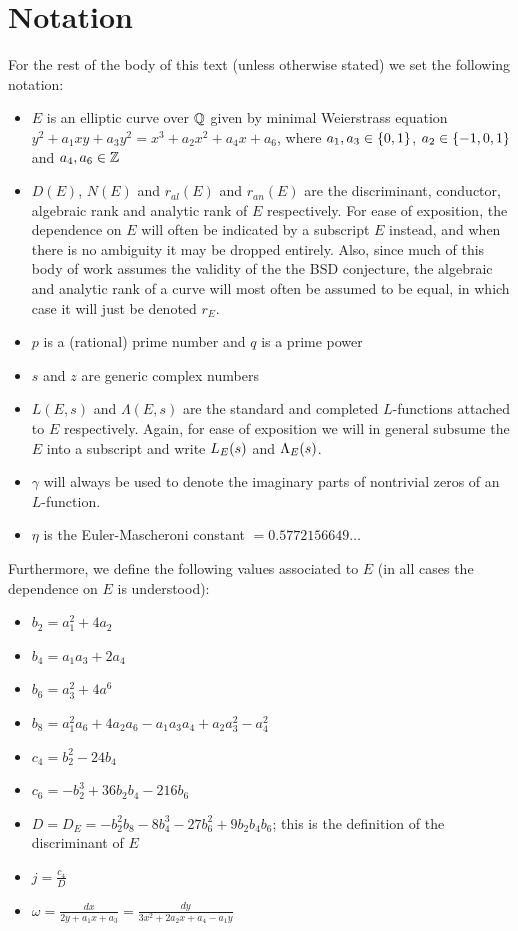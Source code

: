 
\section{Notation}\label{subsec:notation}

For the rest of the body of this text (unless otherwise stated) we set the following notation:
\begin{itemize}
\item $E$ is an elliptic curve over $\mathbb{Q}$ given by minimal Weierstrass equation $y^2 + a_1 xy + a_3 y^2 = x^3 + a_2 x^2 + a_4 x + a_6$, where $a_1, a_3 \in \left\{0,1\right\}$, $a_2 \in \left\{-1,0,1\right\}$ and $a_4,a_6 \in \mathbb{Z}$
\item $D(E)$, $N(E)$ and $r_{al}(E)$  and $r_{an}(E)$ are the discriminant, conductor, algebraic rank and analytic rank of $E$ respectively. For ease of exposition, the dependence on $E$ will often be indicated by a subscript $E$ instead, and when there is no ambiguity it may be dropped entirely. Also, since much of this body of work assumes the validity of the the BSD conjecture, the algebraic and analytic rank of a curve will most often be assumed to be equal, in which case it will just be denoted $r_E$.
\item $p$ is a (rational) prime number and $q$ is a prime power
\item $s$ and $z$ are generic complex numbers
\item $L(E,s)$ and $\Lambda(E,s)$ are the standard and completed $L$-functions attached to $E$ respectively. Again, for ease of exposition we will in general subsume the $E$ into a subscript and write $L_E(s)$ and $\Lambda_E(s)$.
\item $\gamma$ will always be used to denote the imaginary parts of nontrivial zeros of an $L$-function.
\item $\eta$ is the Euler-Mascheroni constant $= 0.5772156649\ldots$ \\
\end{itemize}

Furthermore, we define the following values associated to $E$ (in all cases the dependence on $E$ is understood):
\begin{itemize}
\item $b_2 = a_1^2 + 4a_2$
\item $b_4 = a_1 a_3 + 2a_4$
\item $b_6 = a_3^2 + 4a^6$
\item $b_8 = a_1^2 a_6 + 4 a_2 a_6 - a_1 a_3 a_4 + a_2 a_3^2 - a_4^2$
\item $c_4 = b_2^2 - 24 b_4$
\item $c_6 = -b_2^3 + 36 b_2 b_4  - 216 b_6$
\item $D = D_E = -b_2^2 b_8 - 8 b_4^3 - 27 b_6^2 + 9 b_2 b_4 b_6$; this is the definition of the discriminant of $E$
\item $j = \frac{c_4}{D}$
\item $\omega = \frac{dx}{2y + a_1 x + a_3} = \frac{dy}{3x^2 + 2a_2 x + a_4 - a_1 y}$
\end{itemize}

